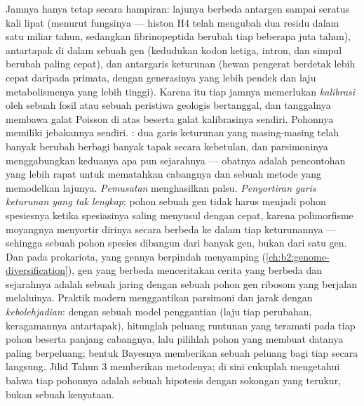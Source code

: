 \begin{proposition}\label{prop:b2:phylogenetic-trees:pitfalls}
%
Jamnya hanya tetap secara hampiran: lajunya berbeda antargen sampai
seratus kali lipat (menurut fungsinya --- histon H4 telah mengubah dua
residu dalam satu miliar tahun, sedangkan fibrinopeptida berubah tiap
beberapa juta tahun), antartapak di dalam sebuah gen (kedudukan kodon
ketiga, intron, dan simpul berubah paling cepat), dan antargaris
keturunan (hewan pengerat berdetak lebih cepat daripada primata, dengan
generasinya yang lebih pendek dan laju metabolismenya yang lebih
tinggi). Karena itu tiap jamnya memerlukan \emph{kalibrasi} oleh sebuah
fosil atau sebuah peristiwa geologis bertanggal, dan tanggalnya membawa
galat Poisson di atas beserta galat kalibrasinya sendiri. Pohonnya
memiliki jebakannya sendiri. \emph{}: dua garis
keturunan yang masing-masing telah banyak berubah berbagi banyak tapak
secara kebetulan, dan parsimoninya menggabungkan keduanya apa pun
sejarahnya --- obatnya adalah pencontohan yang lebih rapat untuk
mematahkan cabangnya dan sebuah metode yang memodelkan lajunya.
\emph{Pemusatan} menghasilkan  palsu. \emph{Penyortiran
garis keturunan yang tak lengkap}: pohon sebuah gen tidak harus menjadi
pohon spesiesnya ketika spesiasinya saling menyusul dengan cepat,
karena polimorfisme moyangnya menyortir dirinya secara berbeda ke dalam
tiap keturunannya --- sehingga sebuah pohon spesies dibangun dari
banyak gen, bukan dari satu gen. Dan pada prokariota, yang gennya
berpindah menyamping (\cref{ch:b2:genome-diversification}), gen yang
berbeda menceritakan cerita yang berbeda dan sejarahnya adalah sebuah
jaring dengan sebuah pohon gen ribosom yang berjalan melaluinya.
Praktik modern menggantikan parsimoni dan jarak dengan
\emph{kebolehjadian}: dengan sebuah model penggantian (laju tiap
perubahan, keragamannya antartapak), hitunglah peluang runtunan yang
teramati pada tiap pohon beserta panjang cabangnya, lalu pilihlah pohon
yang membuat datanya paling berpeluang; bentuk Bayesnya memberikan
sebuah peluang bagi tiap  secara langsung. Jilid Tahun 3
memberikan metodenya; di sini cukuplah mengetahui bahwa tiap pohonnya
adalah sebuah hipotesis dengan sokongan yang terukur, bukan sebuah
kenyataan.
\end{proposition}
